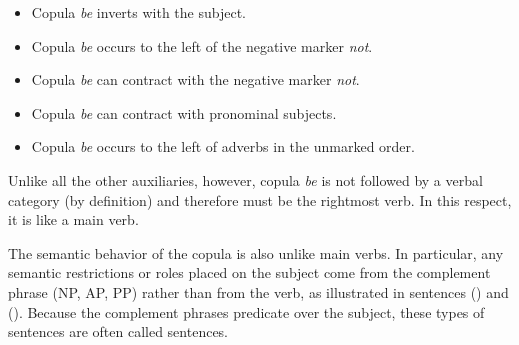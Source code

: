 \begin{itemize}
\item Copula {\it be} inverts with the subject.

\item Copula {\it be} occurs to the left of the negative marker {\it
not}.

\item Copula {\it be} can contract with the negative marker {\it not}.

\item Copula {\it be} can contract with pronominal subjects.

\item Copula {\it be} occurs to the left of adverbs in the unmarked order.
\end{itemize}

Unlike all the other auxiliaries, however, copula {\it be} is not followed by
a verbal category (by definition) and therefore must be the rightmost verb.  In
this respect, it is like a main verb.

The semantic behavior of the copula is also unlike main verbs.  In particular,
any semantic restrictions or roles placed on the subject come from the
complement phrase (NP, AP, PP) rather than from the verb, as illustrated in
sentences ({}) and ({}).  Because the complement phrases predicate
over the subject, these types of sentences are often called
 sentences.



